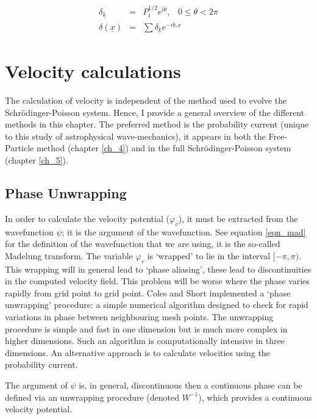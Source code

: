 
\begin{eqnarray}
\delta_{\underline{k}} &=& P_i^{1/2} e^{i\theta}, \;\;\; 0 \le \theta < 2\pi \\
\delta (\underline{x}) &=& \sum \delta_{\underline{k}} e^{-i \underline{k}.\underline{x}}
\label{ifft}
\end{eqnarray}

\section{Velocity calculations}
The calculation of velocity is independent of the method used to evolve the Schr\"odinger-Poisson system. Hence, I provide a general overview of the different methods in this chapter. The preferred method is the probability current (unique to this study of astrophysical wave-mechanics), it appears in both the Free-Particle method (chapter \ref{ch_4}) and in the full Schr\"odinger-Poisson system (chapter \ref{ch_5}).


\subsection{Phase Unwrapping}
In order to calculate the velocity potential ($\varphi_v$), it must be extracted from the wavefunction $\psi$; it is the argument of the wavefunction. See equation \ref{eqn_mad} for the definition of the wavefunction that we are using, it is the so-called Madelung transform. The variable $\varphi_v$ is `wrapped' to lie in the interval  $[-\pi,\pi)$. This wrapping will in general lead to `phase aliasing', these lead to discontinuities in the computed velocity field. This problem will be worse where the phase varies rapidly from grid point to grid point. Coles and Short \citep{bib_sho} implemented a `phase unwrapping' procedure: a simple numerical algorithm designed to check for rapid variations in phase between neighbouring mesh points. The unwrapping procedure is simple and fast in one dimension but is much more complex in higher dimensions. Such an algorithm is computationally intensive in three dimensions. An alternative approach is to calculate velocities using the probability current.

The argument of $\psi$ is, in general, discontinuous then a continuous phase can be defined via an unwrapping procedure (denoted $W^{-1}$), which provides a continuous velocity potential.

